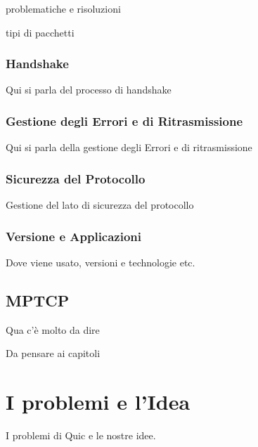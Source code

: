 problematiche e risoluzioni 

tipi di pacchetti

\subsubsection{Handshake}

Qui si parla del processo di handshake

\subsubsection{Gestione degli Errori e di Ritrasmissione}

Qui si parla della gestione degli Errori e di ritrasmissione

\subsubsection{Sicurezza del Protocollo}

Gestione del lato di sicurezza del protocollo

\subsubsection{Versione e Applicazioni }
Dove viene usato, versioni e technologie etc.

\subsection{MPTCP}

Qua c'è molto da dire

Da pensare ai capitoli 

\section{I problemi e l'Idea}

I problemi di Quic e le nostre idee.


